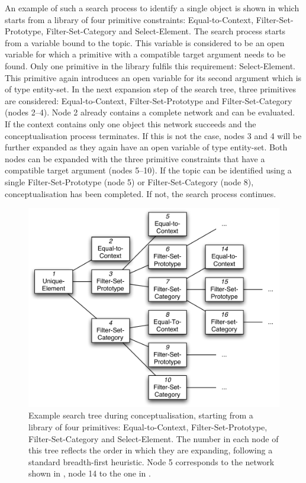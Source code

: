 An example of such a search process to identify a single object is
shown in  which starts from a library
of four primitive constraints: {\sc Equal-to-Context}, {\sc
  Filter-Set-Prototype}, {\sc Filter-Set-Category} and {\sc
  Select-Element}. The search process starts from a variable bound to
the topic. This variable is considered to be an open variable for
which a primitive with a compatible target argument needs to be
found. Only one primitive in the library fulfils this requirement:
{\sc Select-Element}. This primitive again introduces an open variable
for its second argument which is of type entity-set. In the next
expansion step of the search tree, three primitives are considered:
{\sc Equal-to-Context}, {\sc Filter-Set-Prototype} and {\sc
  Filter-Set-Category} (nodes 2--4). Node 2 already contains a complete
network and can be evaluated. If the context contains only one object
this network succeeds and the conceptualisation process terminates. If
this is not the case, nodes 3 and 4 will be further expanded as they
again have an open variable of type entity-set. Both nodes can be
expanded with the three primitive constraints that have a compatible
target argument (nodes 5--10). If the topic can be identified using a
single {\sc Filter-Set-Prototype} (node 5) or {\sc
  Filter-Set-Category} (node 8), conceptualisation has been
completed. If not, the search process continues.

\begin{figure}[t]
  \begin{center}
    \includegraphics[width=.6\textwidth]{./frameworks/figures/conceptualisation.pdf}
    \caption[Example of the conceptualisation process]{Example search
      tree during conceptualisation, starting from a library of four
      primitives: {\sc Equal-to-Context}, {\sc Filter-Set-Prototype},
      {\sc Filter-Set-Category} and {\sc Select-Element}. The number
      in each node of this tree reflects the order in which they are
      expanding, following a standard breadth-first heuristic. Node 5
      corresponds to the network shown in , node
      14 to the one in .}
    \label{f:conceptualisation}
  \end{center}
\end{figure}

